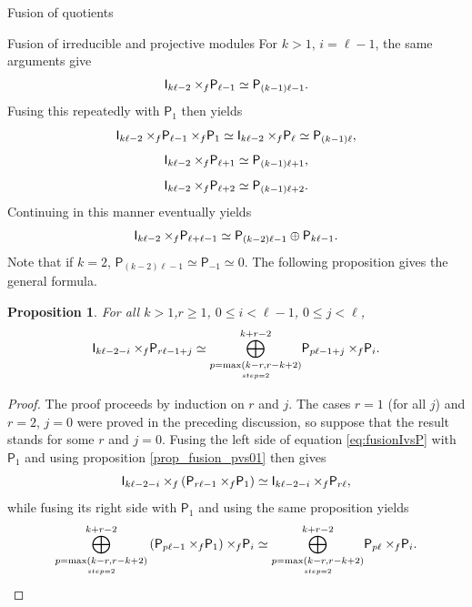 \documentclass[reqno]{amsart}
\newtheorem{Prop}[Thm]{Proposition}
\newcommand{\dl}[1]{\mathsf I_{#1}}
\newcommand{\dP}[1]{\mathsf P_{#1}}
\newcommand{\xf}{\times\hspace{-0.27em}_f}
\newcommand{\lc}{\ell}
\begin{document}
\begin{section}{Fusion of quotients}
\begin{subsection}{Fusion of irreducible and projective modules}
 For $k>1$, $i=\lc-1$, the same arguments give
\begin{equation*}
\dl{k\lc -2} \xf \dP{\lc-1} \simeq \dP{(k-1)\lc -1}.
\end{equation*}
Fusing this repeatedly with $\dP{1}$ then yields
\begin{equation*}
\dl{k \lc -2} \xf \dP{\lc-1} \xf \dP{1} \simeq \dl{k\lc -2} \xf \dP{\lc} \simeq \dP{(k-1)\lc},
\end{equation*}
\begin{equation*}
\dl{k \lc -2} \xf \dP{\lc+1} \simeq \dP{(k-1)\lc +1},
\end{equation*}
\begin{equation*}
\dl{k \lc -2} \xf \dP{\lc+2} \simeq \dP{(k-1)\lc +2}.
\end{equation*}
Continuing in this manner eventually yields
\begin{equation*}
\dl{k\lc -2} \xf \dP{\lc  + \lc -1} \simeq \dP{(k-2)\lc -1} \oplus \dP{k \lc -1}.
\end{equation*}
Note that if $k=2$, $\dP{(k-2)\lc -1} \simeq \dP{ -1}\simeq 0$. The following proposition gives the general formula.
\begin{Prop}\label{prop:fusionIvsP}
For all $k>1$,$r\geq 1 $, $0\leq i < \lc-1$, $0\leq j<\lc$,
\begin{equation}\label{eq:fusionIvsP}
\dl{k \lc -2- i} \xf \dP{r \lc -1 +j} \simeq \overset{k+r-2}{\underset{\underset{step=2}{p = \max\left(k-r, r-k +2 \right)}}{\bigoplus}} \dP{p \lc -1 +j} \xf \dP{i}.
\end{equation}
\end{Prop}
\begin{proof}
The proof proceeds by induction on $r$ and $j$. The cases $r=1$ (for all $j$) and $r =2$, $j=0$ were proved in the preceding discussion, so  suppose that the result stands for some $r$ and $j =0$. Fusing the left side of equation \eqref{eq:fusionIvsP} with $\dP{1}$ and using proposition \ref{prop_fusion_pvs01} then gives
\begin{equation*}
	\dl{k \lc -2- i} \xf \left( \dP{r \lc -1} \xf \dP{1}\right) \simeq \dl{k \lc -2 -i} \xf \dP{r \lc} ,
\end{equation*}
while fusing its right side with $\dP{1}$ and using the same proposition yields
\begin{equation*}
	\overset{k+r-2}{\underset{\underset{step=2}{p = \max\left(k-r, r-k +2 \right)}}{\bigoplus}}\left( \dP{p \lc -1 } \xf \dP{1} \right)\xf \dP{i} \simeq \overset{k+r-2}{\underset{\underset{step=2}{p = \max\left(k-r, r-k +2 \right)}}{\bigoplus}} \dP{p \lc } \xf \dP{i}.

\end{equation*}
\end{proof}
\end{subsection}
\end{section}
\end{document}
